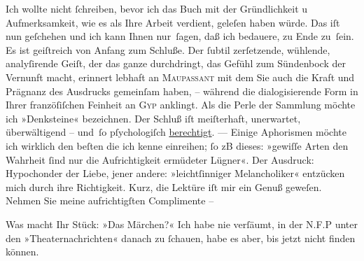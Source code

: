 \pstart
           Ich wollte nicht{ }ſchreiben, bevor ich das Buch mit der Gründlichkeit u Aufmerksamkeit, wie es als
               Ihre Arbeit verdient, geleſen haben würde. Das iſt nun geſchehen {\pb}und ich kann Ihnen nur ſagen, daß ich
               bedauere, zu Ende zu ſein. Es ist geiſtreich von Anfang zum Schluße. Der{ }ſubtil
               zerſetzende, wühlende, analyſirende Geiſt, der das ganze durchdringt, das Gefühl zum
               Sündenbock der Vernunft macht, erinnert lebhaft an \textsc{Maupaſsant} mit dem Sie auch die Kraft und Prägnanz des Ausdrucks gemeinſam haben, –
               während die dialogisierende Form in Ihrer franzöſiſchen Feinheit an \textsc{Gyp} anklingt. Als die Perle der Sammlung möchte ich »Denksteine«
               bezeichnen. Der Schluß iſt {\pb}meiſterhaft,
               unerwartet, überwältigend – und ſo pſychologiſch \uline{berechtigt}. — Einige Aphorismen möchte ich wirklich den beſten  die ich kenne einreihen;{ }ſo \strikeout{\textcolor{gray}{werden}} zB \introOben{}dieses\introOben{}: »gewiſſe Arten den Wahrheit{ }ſind nur die
               Aufrichtigkeit ermüdeter Lügner«. Der Ausdruck: Hypochonder der Liebe, jener andere:
               »leichtſinniger Melancholiker« entzücken mich durch ihre Richtigkeit. Kurz, die
               Lektüre iſt mir ein Genuß geweſen. Nehmen Sie meine aufrichtigſten Complimente –\pend
           
\pstart
           Was macht Ihr Stück: »Das Märchen?« Ich habe nie
               verſäumt, in der N.F.P unter den
               »Theaternachrichten« danach zu{ }ſchauen, habe es aber, bis {\pb}jetzt nicht finden können.\pend
           
